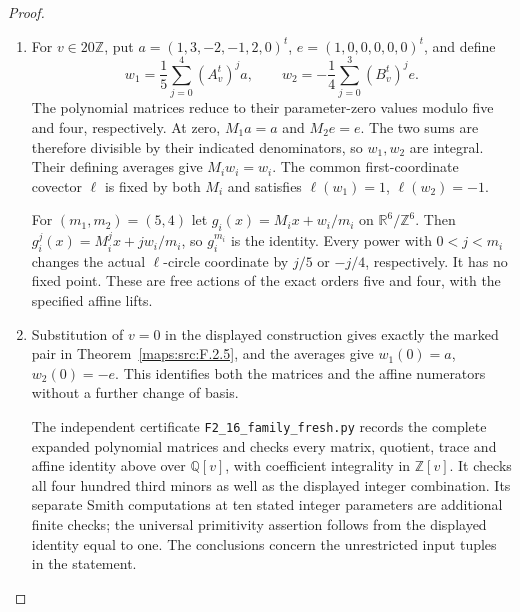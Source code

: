 \documentclass[11pt,a4paper]{article}
\theoremstyle{definition}
\begin{document}
\begin{proof}
\begin{enumerate}[label=\arabic*.]
\item For $v\in20\mathbb Z$, put
$a=(1,3,-2,-1,2,0)^t$, $e=(1,0,0,0,0,0)^t$, and define
\[
 w_1=\frac15\sum_{j=0}^4(A_v^t)^j a,
 \qquad
 w_2=-\frac14\sum_{j=0}^3(B_v^t)^j e.
 \tag{F.U7}\label{maps:eq:F.U7}
\]
The polynomial matrices reduce to their parameter-zero
values modulo five and four, respectively. At zero,
$M_1a=a$ and $M_2e=e$. The two sums are therefore divisible
by their indicated denominators, so $w_1,w_2$ are integral.
Their defining averages give $M_iw_i=w_i$. The common
first-coordinate covector $\ell$ is fixed by both $M_i$ and
satisfies $\ell(w_1)=1$, $\ell(w_2)=-1$.

For $(m_1,m_2)=(5,4)$ let
$g_i(x)=M_ix+w_i/m_i$ on $\mathbb R^6/\mathbb Z^6$.
Then $g_i^j(x)=M_i^jx+jw_i/m_i$, so $g_i^{m_i}$ is the
identity. Every power with $0<j<m_i$ changes the actual
$\ell$-circle coordinate by $j/5$ or $-j/4$, respectively.
It has no fixed point. These are free actions of the exact
orders five and four, with the specified affine lifts.

\item Substitution of $v=0$ in the displayed construction gives
exactly the marked pair in Theorem~\ref{maps:src:F.2.5}, and
the averages give $w_1(0)=a$, $w_2(0)=-e$. This identifies
both the matrices and the affine numerators without a further
change of basis.

The independent certificate
\texttt{F2\_16\_family\_fresh.py} records the complete expanded
polynomial matrices and checks every matrix, quotient, trace
and affine identity above over $\mathbb Q[v]$, with coefficient
integrality in $\mathbb Z[v]$. It checks all four hundred
third minors as well as the displayed integer combination.
Its separate Smith computations at ten stated integer
parameters are additional finite checks; the universal
primitivity assertion follows from the displayed identity
equal to one. The conclusions concern the unrestricted
input tuples in the statement.
\end{enumerate}
\end{proof}
\end{document}
